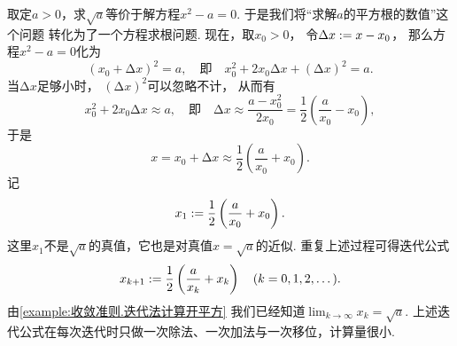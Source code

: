 取定\(a>0\)，求\(\sqrt{a}\)等价于解方程\(x^2-a=0\).
于是我们将“求解\(a\)的平方根的数值”这个问题
转化为了一个方程求根问题.
现在，取\(x_0>0\)，
令\(\Delta x := x - x_0\)，
那么方程\(x^2-a=0\)化为\begin{equation*}
	(x_0 + \increment x)^2 = a,
	\quad\text{即}\quad
	x_0^2 + 2 x_0 \increment x + (\increment x)^2 = a.
\end{equation*}
当\(\increment x\)足够小时，
\((\increment x)^2\)可以忽略不计，
从而有\begin{equation*}
	x_0^2 + 2 x_0 \increment x \approx a,
	\quad\text{即}\quad
	\increment x
	\approx \frac{a - x_0^2}{2 x_0}
	= \frac12 \left( \frac{a}{x_0} - x_0 \right),
\end{equation*}
于是\begin{equation*}
	x = x_0 + \increment x
	\approx \frac12 \left( \frac{a}{x_0} + x_0 \right).
\end{equation*}
记\begin{equation*}
	x_1 := \frac12 \left( \frac{a}{x_0} + x_0 \right).
\end{equation*}
这里\(x_1\)不是\(\sqrt{a}\)的真值，它也是对真值\(x = \sqrt{a}\)的近似.
重复上述过程可得迭代公式\begin{equation*}
	x_{k+1} := \frac12 \left( \frac{a}{x_k} + x_k \right)
	\quad(k=0,1,2,\dotsc).
\end{equation*}
由\cref{example:收敛准则.迭代法计算开平方}
我们已经知道\(\lim_{k\to\infty} x_k = \sqrt{a}\).
上述迭代公式在每次迭代时只做一次除法、一次加法与一次移位，计算量很小.
